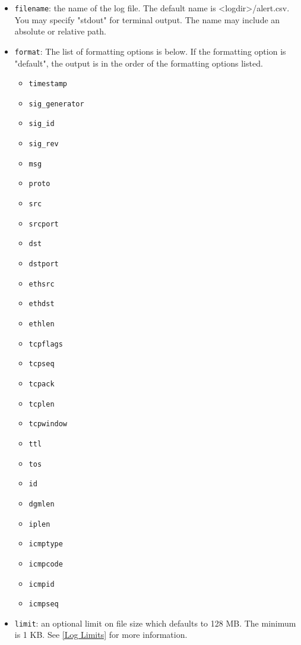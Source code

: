 \documentclass[english]{report}
\begin{document}
\begin{itemize}
\item \texttt{filename}: the name of the log file.  The default name is
<logdir>/alert.csv.  You may specify "stdout" for terminal output.  The name
may include an absolute or relative path.

\item \texttt{format}: The list of formatting options is below. If the
formatting option is "default", the output is in the order of the formatting
options listed.

\begin{itemize}
\item \texttt{timestamp}
\item \texttt{sig\_generator}
\item \texttt{sig\_id}
\item \texttt{sig\_rev}
\item \texttt{msg}
\item \texttt{proto}
\item \texttt{src}
\item \texttt{srcport}
\item \texttt{dst}
\item \texttt{dstport}
\item \texttt{ethsrc}
\item \texttt{ethdst}
\item \texttt{ethlen}
\item \texttt{tcpflags}
\item \texttt{tcpseq}
\item \texttt{tcpack}
\item \texttt{tcplen}
\item \texttt{tcpwindow}
\item \texttt{ttl}
\item \texttt{tos}
\item \texttt{id}
\item \texttt{dgmlen}
\item \texttt{iplen}
\item \texttt{icmptype}
\item \texttt{icmpcode}
\item \texttt{icmpid}
\item \texttt{icmpseq}
\end{itemize}

\item \texttt{limit}: an optional limit on file size which defaults to 128 MB.  
The minimum is 1 KB.  See \ref{Log Limits} for more information.
\end{itemize}
\end{document}
